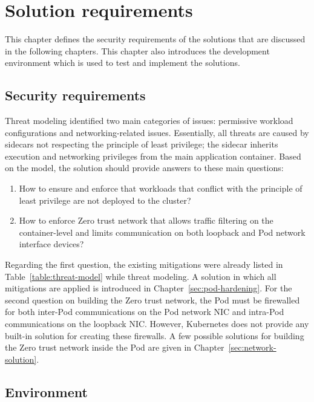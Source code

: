 \documentclass[english, 12pt, a4paper, sci, utf8, a-2b, online]{aaltothesis}
\begin{document}
\clearpage

\section{Solution requirements} \label{sec:methods}

This chapter defines the security requirements of the solutions that are discussed in the following chapters. This chapter also introduces the development environment which is used to test and implement the solutions.

\subsection{Security requirements}

Threat modeling identified two main categories of issues: permissive workload configurations and networking-related issues.
Essentially, all threats are caused by sidecars not respecting the principle of least privilege; the sidecar inherits execution and networking privileges from the main application container.
Based on the model, the solution should provide answers to these main questions:

\begin{enumerate}
  \item How to ensure and enforce that workloads that conflict with the principle of least privilege are not deployed to the cluster?
  \item How to enforce Zero trust network that allows traffic filtering on the container-level and limits communication on both loopback and Pod network interface devices?
\end{enumerate}

Regarding the first question, the existing mitigations were already listed in Table~\ref{table:threat-model} while threat modeling.
A solution in which all mitigations are applied is introduced in Chapter~\ref{sec:pod-hardening}.
For the second question on building the Zero trust network, the Pod must be firewalled for both inter-Pod communications on the Pod network NIC and intra-Pod communications on the loopback NIC.
However, Kubernetes does not provide any built-in solution for creating these firewalls.
A few possible solutions for building the Zero trust network inside the Pod are given in Chapter~\ref{sec:network-solution}.

\subsection{Environment}
\end{document}
